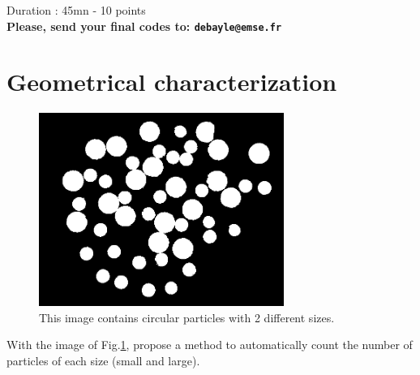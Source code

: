 
\noindent
Duration : 45mn - 10 points\\
{\bf Please, send your final codes to: \texttt{debayle@emse.fr}}\\


\section{Geometrical characterization}

\begin{figure}[htbp]
 \centering
 \includegraphics[width=8cm]{disks.png}
 \caption{This image contains circular particles with 2 different sizes.}
 \label{fig:exam_2016:disks}
\end{figure}

\begin{qbox}
With the image of Fig.\ref{fig:exam_2016:disks}, propose a method to automatically count the number of particles of each size (small and large).
\end{qbox}


